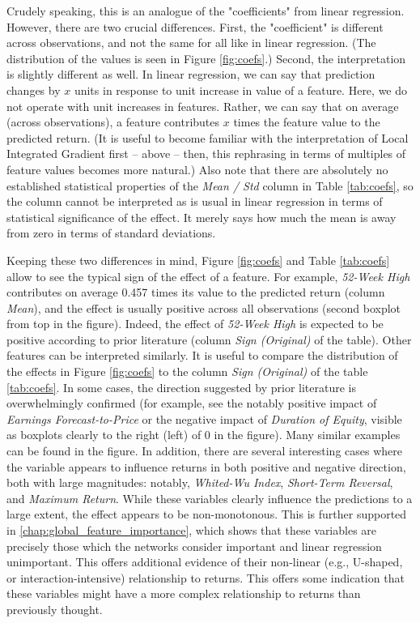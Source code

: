 	Crudely speaking, this is an analogue of the "coefficients" from linear regression. 
	However, there are two crucial differences. First, the "coefficient" is different across observations, and not the same for all like in linear regression. (The distribution of the values is seen in Figure \ref{fig:coefs}.) Second, the interpretation is slightly different as well. In linear regression, we can say that prediction changes by $x$ units in response to unit increase in value of a feature. Here, we do not operate with unit increases in features. Rather, we can say that on average (across observations), a feature contributes $x$ times the feature value to the predicted return. (It is useful to become familiar with the interpretation of Local Integrated Gradient first -- above -- then, this rephrasing in terms of multiples of feature values becomes more natural.) Also note that there are absolutely no established statistical properties of the \textit{Mean / Std} column in Table \ref{tab:coefs}, so the column cannot be interpreted as is usual in linear regression in terms of statistical significance of the effect. It merely says how much the mean is away from zero in terms of standard deviations. 
	
	Keeping these two differences in mind, Figure \ref{fig:coefs} and Table \ref{tab:coefs} allow to see the typical sign of the effect of a feature. For example, \textit{52-Week High} contributes on average 0.457 times its value to the predicted return (column \textit{Mean}), and the effect is usually positive across all observations (second boxplot from top in the figure). Indeed, the effect of \textit{52-Week High} is expected to be positive according to prior literature (column \textit{Sign (Original)} of the table). Other features can be interpreted similarly. It is useful to compare the distribution of the effects in Figure \ref{fig:coefs} to the column \textit{Sign (Original)} of the table \ref{tab:coefs}. In some cases, the direction suggested by prior literature is overwhelmingly confirmed (for example, see the notably positive impact of \textit{Earnings Forecast-to-Price} or the negative impact of \textit{Duration of Equity}, visible as boxplots clearly to the right (left) of 0 in the figure). Many similar examples can be found in the figure. In addition, there are several interesting cases where the variable appears to influence returns in both positive and negative direction, both with large magnitudes: notably, \textit{Whited-Wu Index}, \textit{Short-Term Reversal}, and \textit{Maximum Return}. While these variables clearly influence the predictions to a large extent, the effect appears to be non-monotonous. This is further supported in \ref{chap:global_feature_importance}, which shows that these variables are precisely those which the networks consider important and linear regression unimportant. This offers additional evidence of their non-linear (e.g., U-shaped, or interaction-intensive) relationship to returns. This offers some indication that these variables might have a more complex relationship to returns than previously thought. 
	
